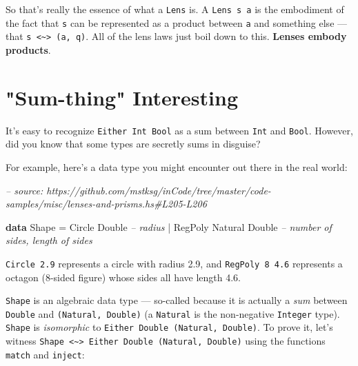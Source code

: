 \documentclass[]{article}
\newenvironment{Shaded}{}{}
\newcommand{\CommentTok}[1]{\textcolor[rgb]{0.38,0.63,0.69}{\textit{#1}}}
\newcommand{\DataTypeTok}[1]{\textcolor[rgb]{0.56,0.13,0.00}{#1}}
\newcommand{\FunctionTok}[1]{\textcolor[rgb]{0.02,0.16,0.49}{#1}}
\newcommand{\KeywordTok}[1]{\textcolor[rgb]{0.00,0.44,0.13}{\textbf{#1}}}
\begin{document}
So that's really the essence of what a \texttt{Lens\textquotesingle{}} is. A
\texttt{Lens\textquotesingle{}\ s\ a} is the embodiment of the fact that
\texttt{s} can be represented as a product between \texttt{a} and something else
--- that \texttt{s\ \textless{}\textasciitilde{}\textgreater{}\ (a,\ q)}. All of
the lens laws just boil down to this. \textbf{Lenses embody products}.

\hypertarget{sum-thing-interesting}{%
\section{"Sum-thing" Interesting}\label{sum-thing-interesting}}

It's easy to recognize \texttt{Either\ Int\ Bool} as a sum between \texttt{Int}
and \texttt{Bool}. However, did you know that some types are secretly sums in
disguise?

For example, here's a data type you might encounter out there in the real world:

\begin{Shaded}
\begin{Highlighting}[]
\CommentTok{-- source: https://github.com/mstksg/inCode/tree/master/code-samples/misc/lenses-and-prisms.hs#L205-L206}

\KeywordTok{data} \DataTypeTok{Shape} \FunctionTok{=} \DataTypeTok{Circle}  \DataTypeTok{Double}           \CommentTok{-- radius}
           \FunctionTok{|} \DataTypeTok{RegPoly} \DataTypeTok{Natural} \DataTypeTok{Double}   \CommentTok{-- number of sides, length of sides}
\end{Highlighting}
\end{Shaded}

\texttt{Circle\ 2.9} represents a circle with radius 2.9, and
\texttt{RegPoly\ 8\ 4.6} represents a octagon (8-sided figure) whose sides all
have length 4.6.

\texttt{Shape} is an algebraic data type --- so-called because it is actually a
\emph{sum} between \texttt{Double} and \texttt{(Natural,\ Double)} (a
\texttt{Natural} is the non-negative \texttt{Integer} type). \texttt{Shape} is
\emph{isomorphic} to \texttt{Either\ Double\ (Natural,\ Double)}. To prove it,
let's witness
\texttt{Shape\ \textless{}\textasciitilde{}\textgreater{}\ Either\ Double\ (Natural,\ Double)}
using the functions \texttt{match} and \texttt{inject}:
\end{document}
